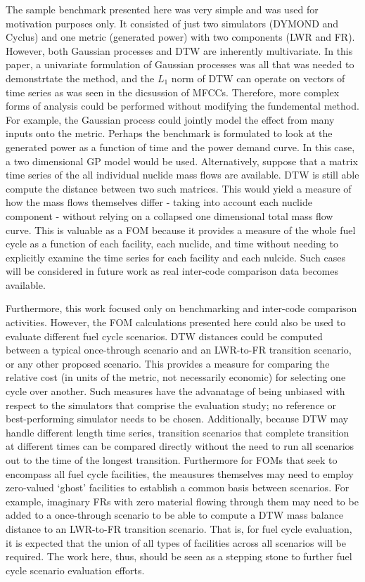 The sample benchmark presented here was very simple and was used for motivation 
purposes only. It consisted of just
two simulators (DYMOND and Cyclus) and one metric (generated power) with
two components (LWR and FR).  However, both Gaussian processes and DTW
are inherently multivariate. In this paper, a univariate formulation of 
Gaussian processes was all that was needed to demonstrtate the method, and 
the $L_1$ norm of DTW can operate on vectors of time series as was seen 
in the dicsussion of MFCCs. Therefore, more complex forms of analysis could 
be performed without modifying the fundemental method. For example, the Gaussian process could jointly model the 
effect from many inputs onto the metric. Perhaps the benchmark is formulated
to look at the generated power as a function of time and the power demand curve.
In this case, a two dimensional GP model would be used. Alternatively, 
suppose that a matrix time series of the all individual nuclide mass flows 
are available. DTW is still able compute the distance between two 
such matrices. This would yield a measure of how the mass flows themselves
differ - taking into account each nuclide component - without relying on a 
collapsed one dimensional total mass flow curve. 
This is valuable as a FOM because it provides a measure of the whole fuel
cycle as a function of each facility, each nuclide, and time 
without needing to explicitly examine the time series for each facility 
and each nulcide.
Such cases will be considered in
future work as real inter-code comparison data becomes available.

Furthermore, this work focused only on benchmarking and inter-code comparison
activities.
However, the FOM calculations presented here could also be used to evaluate 
different fuel cycle scenarios. DTW distances could be computed between
a typical once-through scenario and an LWR-to-FR transition
scenario, or any other proposed scenario. This provides a measure for 
comparing the relative cost (in units of the metric, not necessarily 
economic) for selecting one cycle over another. 
Such measures have the advanatage of being unbiased with respect to the 
simulators that comprise the evaluation study; no reference or best-performing
simulator needs to be chosen. 
Additionally, because DTW may handle different length time series, 
transition scenarios that complete transition at different times can be 
compared directly without the need to run all scenarios out to the time of 
the longest transition.
Furthermore for FOMs that seek to encompass all fuel cycle facilities,
the meausures themselves may need to employ zero-valued `ghost' 
facilities to establish a common basis between scenarios.  For example, 
imaginary FRs with zero material flowing through them may need to be added 
to a once-through scenario to be able to compute a DTW mass balance distance 
to an LWR-to-FR transition scenario. That is, for fuel cycle evaluation,
it is expected that the union of all types of facilities across all scenarios 
will be required.
The work here, thus, 
should be seen as a stepping stone to further fuel cycle scenario evaluation
efforts.
